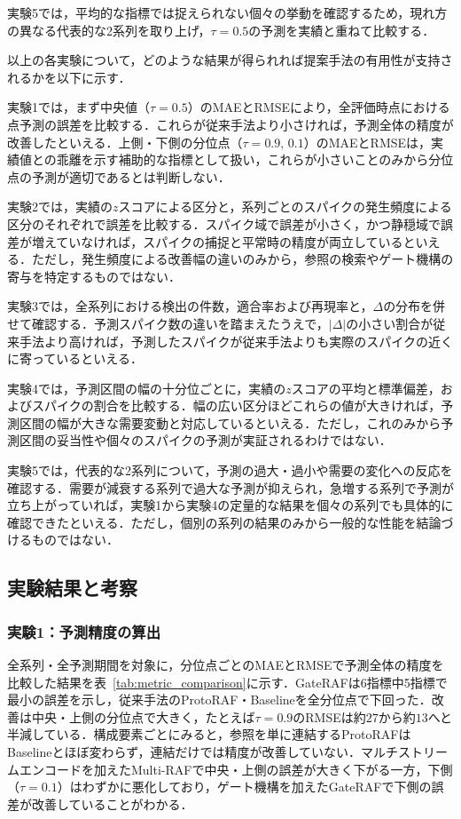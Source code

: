 \documentclass[twocolumn, lastpage]{jarticle}
\newif\ifrevmark
\newcommand{\revBblock}[1]{\ifrevmark{\color{red}#1}\else#1\fi}
\begin{document}
実験5では，平均的な指標では捉えられない個々の挙動を確認するため，現れ方の異なる代表的な2系列を取り上げ，$\tau=0.5$の予測を実績と重ねて比較する．

\revBblock{以上の各実験について，どのような結果が得られれば提案手法の有用性が支持されるかを以下に示す．

実験1では，まず中央値（$\tau=0.5$）のMAEとRMSEにより，全評価時点における点予測の誤差を比較する．これらが従来手法より小さければ，予測全体の精度が改善したといえる．上側・下側の分位点（$\tau=0.9,\,0.1$）のMAEとRMSEは，実績値との乖離を示す補助的な指標として扱い，これらが小さいことのみから分位点の予測が適切であるとは判断しない．

実験2では，実績の$z$スコアによる区分と，系列ごとのスパイクの発生頻度による区分のそれぞれで誤差を比較する．スパイク域で誤差が小さく，かつ静穏域で誤差が増えていなければ，スパイクの捕捉と平常時の精度が両立しているといえる．ただし，発生頻度による改善幅の違いのみから，参照の検索やゲート機構の寄与を特定するものではない．

実験3では，全系列における検出の件数，適合率および再現率と，$\Delta$の分布を併せて確認する．予測スパイク数の違いを踏まえたうえで，$|\Delta|$の小さい割合が従来手法より高ければ，予測したスパイクが従来手法よりも実際のスパイクの近くに寄っているといえる．

実験4では，予測区間の幅の十分位ごとに，実績の$z$スコアの平均と標準偏差，およびスパイクの割合を比較する．幅の広い区分ほどこれらの値が大きければ，予測区間の幅が大きな需要変動と対応しているといえる．ただし，これのみから予測区間の妥当性や個々のスパイクの予測が実証されるわけではない．

実験5では，代表的な2系列について，予測の過大・過小や需要の変化への反応を確認する．需要が減衰する系列で過大な予測が抑えられ，急増する系列で予測が立ち上がっていれば，実験1から実験4の定量的な結果を個々の系列でも具体的に確認できたといえる．ただし，個別の系列の結果のみから一般的な性能を結論づけるものではない．}


\subsection{実験結果と考察}
\subsubsection{実験1：予測精度の算出}
全系列・全予測期間を対象に，分位点ごとのMAEとRMSEで予測全体の精度を比較した結果を表~\ref{tab:metric_comparison}に示す．GateRAFは6指標中5指標で最小の誤差を示し，従来手法のProtoRAF・Baselineを全分位点で下回った．改善は中央・上側の分位点で大きく，たとえば$\tau=0.9$のRMSEは約$27$から約$13$へと半減している．構成要素ごとにみると，参照を単に連結するProtoRAFはBaselineとほぼ変わらず，連結だけでは精度が改善していない．マルチストリームエンコードを加えたMulti-RAFで中央・上側の誤差が大きく下がる一方，下側（$\tau=0.1$）はわずかに悪化しており，ゲート機構を加えたGateRAFで下側の誤差が改善していることがわかる．
\end{document}
